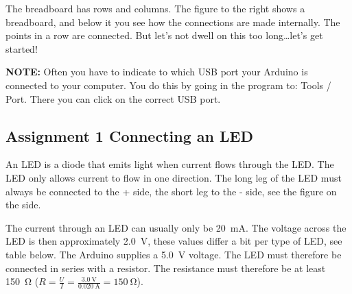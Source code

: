 \documentclass{arduino}
\begin{document}
The breadboard has rows and columns. The figure to the right shows a breadboard, and below it you see how the connections are made internally. The points in a row are connected. But let's not dwell on this too long\dots let's get started!

\textbf{NOTE:} Often you have to indicate to which USB port your Arduino is connected to your computer. You do this by going in the program to: Tools / Port. There you can click on the correct USB port.

\newpage

\subsection{Assignment 1 Connecting an LED}

An LED is a diode that emits light when current flows through the LED. The LED only allows current to flow in one direction. The long leg of the LED must always be connected to the + side, the short leg to the - side, see the figure on the side.

The current through an LED can usually only be \SI{20}{\milli\ampere}. The voltage across the LED is then approximately \SI{2.0}{\volt}, these values ​​differ a bit per type of LED, see table below. The Arduino supplies a \SI{5.0}{\volt} voltage. The LED must therefore be connected in series with a resistor. The resistance must therefore be at least \SI{150}{\ohm} ($R = \frac{U}{I} = \frac{\SI{3.0}{\volt}}{\SI{0.020}{\ampere}} = \SI{150}{\ohm}$).
\end{document}
